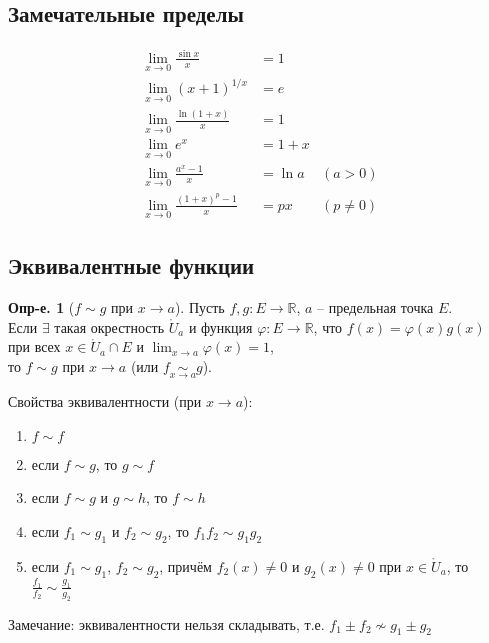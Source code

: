\documentclass[a4paper,12pt]{article}
\numberwithin{figure}{section}
\theoremstyle{definition}
\newtheorem{definition}{Опр-е.}[section]
\theoremstyle{definition}
\def\DS{\displaystyle}
\def\ringU{\mathring{U}}
\def\mathR{\mathbb{R}}
\def\on{\!:}
\begin{document}
\subsection{Замечательные пределы}

\begin{align*}
	   \lim_{x\to 0} \frac{\sin x}x &= 1
	\\ \lim_{x\to 0} \left(x+1\right)^{1/x} &= e
	\\ \lim_{x\to 0} \frac{\ln(1+x)}x &= 1
	\\ \lim_{x\to 0} e^x &= 1+x
	\\ \lim_{x\to 0} \frac{a^x-1}x &= \ln a    &(a>0)
	\\ \lim_{x\to 0} \frac{(1+x)^p-1}x &= px   &(p \ne 0)
\end{align*}


\subsection{Эквивалентные функции}

\begin{definition}[$f \sim g$ при $x \to a$]
	Пусть $f,g\on E\to \mathR$, $a$ -- предельная точка $E$. \\
	Если $\exists$ такая окрестность $\ringU_a$ и функция $\varphi\on E\to\mathR$,
	что $f(x)=\varphi(x)g(x)$ при всех $x\in\ringU_a\cap E$
	и $\DS \lim_{x\to a}\varphi(x)=1$,\\
	то $f \sim g$ при $x\to a$ (или $\DS f \underset{x\to a}{\sim} g$).
\end{definition}

\medskip
Свойства эквивалентности (при $x \to a$): \begin{enumerate}
	\item $f \sim f$
	\item если $f \sim g$, то $g \sim f$
	\item если $f \sim g$ и $g \sim h$, то $f \sim h$
	\item если $f_1 \sim g_1$ и $f_2 \sim g_2$, то $f_1 f_2 \sim g_1 g_2$
	\item если $f_1 \sim g_1$, $f_2 \sim g_2$, причём
		  $f_2(x)\ne0$ и $g_2(x)\ne0$ при $x\in \ringU_a$,
		  то $\DS \frac{f_1}{f_2} \sim \frac{g_1}{g_2}$
\end{enumerate}

Замечание: эквивалентности нельзя складывать, т.е. $f_1 \pm f_2 \not\sim g_1 \pm g_2$
\end{document}
